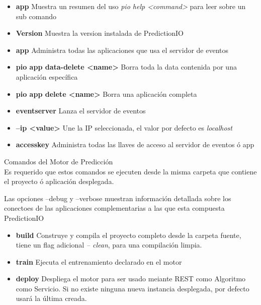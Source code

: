 \begin{itemize}
	\item \textbf{app} Muestra un resumen del uso  \emph{pio help <command>} para leer sobre un sub comando
	
	\item \textbf{Version} Muestra la version instalada de PredictionIO
	
	
	\item \textbf{app }  Administra todas las aplicaciones que usa el servidor de eventos
	\item \textbf{pio app data-delete <name> } Borra toda la data contenida por una aplicación específica
	\item \textbf{pio app delete <name> }  Borra una aplicación completa
	\item \textbf{eventserver }  Lanza el servidor de eventos
	\item \textbf{ --ip <value> } Une la IP seleccionada, el valor por defecto es \emph{localhost}
	\item \textbf{accesskey} Administra todas las llaves de acceso al servidor de eventos ó app
	
\end{itemize}


Comandos del Motor de Predicción\\

Es requerido que estos comandos se ejecuten desde la misma carpeta que contiene el proyecto ó aplicación desplegada.

Las opciones  --debug y --verbose  muestran información detallada sobre los conectoes de las aplicaciones complementarias a las que esta compuesta PredictionIO

\begin{itemize}
	\item \textbf{build} Construye y compila el proyecto completo desde la carpeta fuente, tiene un flag adicional \emph{-- clean}, para una compilación limpia.

	\item \textbf{train} Ejecuta el entrenamiento declarado en el motor 

	\item \textbf{deploy} Despliega el motor para ser usado meiante REST como Algoritmo como Servicio. Si no existe ninguna nueva instancia  desplegada, por defecto usará la última creada.
	
\end{itemize}



